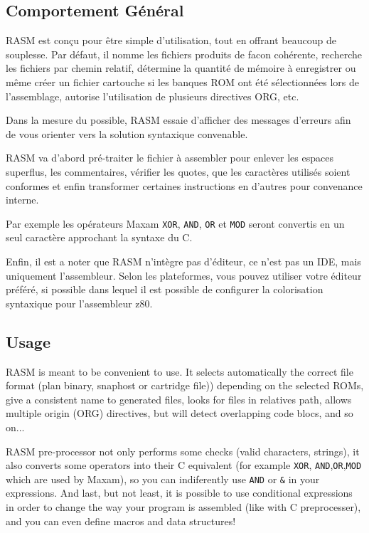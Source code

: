 \begin{xfr}
  \section {Comportement Général}
  RASM est conçu pour être simple d'utilisation, tout en offrant beaucoup de souplesse. Par défaut, il nomme les fichiers produits de facon cohérente, recherche les fichiers par chemin relatif, détermine la quantité de mémoire à enregistrer ou même créer un fichier cartouche si les banques ROM ont été sélectionnées lors de l'assemblage, autorise l'utilisation de plusieurs directives ORG, etc.

  Dans la mesure du possible, RASM essaie d'afficher des messages d'erreurs afin de vous orienter vers la solution syntaxique convenable.

  RASM va d'abord pré-traiter le fichier à assembler pour enlever les espaces superflus, les commentaires, vérifier les quotes, que les caractères utilisés soient conformes et enfin transformer certaines instructions en d'autres pour convenance interne.

 Par exemple les opérateurs Maxam \texttt{XOR}, \texttt{AND}, \texttt{OR} et \texttt{MOD} seront convertis en un seul caractère approchant la syntaxe du C.

Enfin, il est a noter que RASM n'intègre pas d'éditeur, ce n'est pas un IDE, mais uniquement l'assembleur. Selon les plateformes, vous pouvez utiliser votre éditeur préféré, si possible dans lequel il est possible de configurer la colorisation syntaxique pour l'assembleur z80.


\end{xfr}

\begin{xen}
  \section {Usage}
  RASM is meant to be convenient to use. It selects automatically the correct file format (plan binary, snaphost or cartridge file)) depending on the selected ROMs, give a consistent name to generated files, looks for files in relatives path, allows multiple origin (ORG) directives, but will detect overlapping code blocs, and so on...


  RASM pre-processor not only performs some checks (valid characters, strings), it also converts some operators into their C equivalent (for example \texttt{XOR}, \texttt{AND},\texttt{OR},\texttt{MOD} which are used by Maxam), so you can indiferently use \texttt{AND} or \texttt{\&} in your expressions.
  And last, but not least, it is possible to use conditional expressions in order to change the way your program is assembled (like with C preprocesser), and you can even define macros and data structures!
\end{xen}

